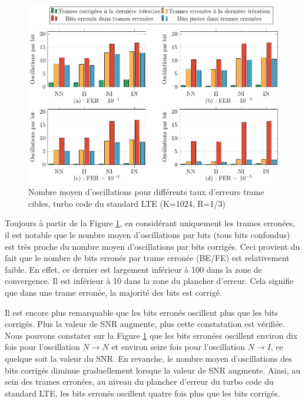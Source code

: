 \begin{figure}[tb]
	\begin{center}
	\includegraphics[width=.9\textwidth]{main/ch2_fig/tikz/m_lte.pdf}
	\caption{Nombre moyen d'oscillations pour différents taux d'erreurs trame cibles, turbo code du standard LTE (K=1024, R=1/3) \label{ch2:fig:meanlte}}
	\end{center}
\end{figure}

Toujours à partir de la Figure \ref{ch2:fig:meanlte}, en considérant uniquement les trames erronées, il est notable que le nombre moyen 
d’oscillations par bits (tous bits confondus) est très proche du nombre moyen d’oscillations par bits corrigés. Ceci 
provient du fait que le nombre de bits erronés par trame erronée (BE/FE) est relativement faible. En effet, ce dernier 
est largement inférieur à 100 dans la zone de convergence. Il est inférieur à 10 dans la zone du plancher d'erreur. Cela
signifie que dans une trame erronée, la majorité des bits est corrigé. 

Il est encore plus remarquable que les bits erronés oscillent plus que les bits corrigés. Plus la valeur de SNR augmente, 
plus cette constatation est vérifiée. Nous pouvons constater sur la Figure \ref{ch2:fig:meanlte} que les bits erronées 
oscillent environ dix fois pour l'oscillation $N\rightarrow N$ et environ seize fois pour 
l'oscillation $N\rightarrow I$, ce quelque soit la valeur du SNR. En revanche, le nombre moyen d'oscillations des bits corrigés 
diminue graduellement lorsque la valeur de SNR augmente. Ainsi, au sein des trames erronées, au niveau du plancher d'erreur 
du turbo code du standard LTE, les bits erronés oscillent quatre fois plus que les bits corrigés.


